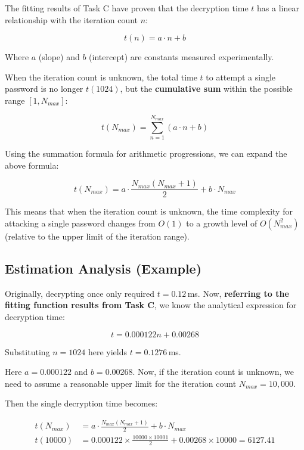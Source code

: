 \documentclass[12pt,a4paper]{article}
\begin{document}
The fitting results of Task C have proven that the decryption time $t$ has a linear relationship with the iteration count $n$:

\begin{equation}
t(n) = a \cdot n + b
\end{equation}

Where $a$ (slope) and $b$ (intercept) are constants measured experimentally.

When the iteration count is unknown, the total time $t$ to attempt a single password is no longer $t(1024)$, but the \textbf{cumulative sum} within the possible range $[1, N_{max}]$:

\begin{equation}
t(N_{max}) = \sum_{n=1}^{N_{max}} (a \cdot n + b)
\end{equation}

Using the summation formula for arithmetic progressions, we can expand the above formula:

\begin{equation}
t(N_{max}) = a \cdot \frac{N_{max}(N_{max} + 1)}{2} + b \cdot N_{max}
\end{equation}

This means that when the iteration count is unknown, the time complexity for attacking a single password changes from $O(1)$ to a growth level of \textbf{$O(N_{max}^2)$} (relative to the upper limit of the iteration range).

\subsection{Estimation Analysis (Example)}

Originally, decrypting  once only required $t = 0.12$\,ms. Now, \textbf{referring to the fitting function results from Task C}, we know the analytical expression for decryption time:

\begin{equation}
t = 0.000122n + 0.00268
\end{equation}

Substituting $n=1024$ here yields $t=0.1276$\,ms.

Here $a=0.000122$ and $b=0.00268$. Now, if the iteration count is unknown, we need to assume a reasonable upper limit for the iteration count $N_{max} = 10,000$.

Then the single decryption time becomes:

\begin{align*}
t(N_{max}) &= a \cdot \frac{N_{max}(N_{max} + 1)}{2} + b \cdot N_{max} \\
t(10000)&=0.000122\times\frac{10000\times10001}{2}+0.00268\times10000 =6127.41
\end{align*}
\end{document}
